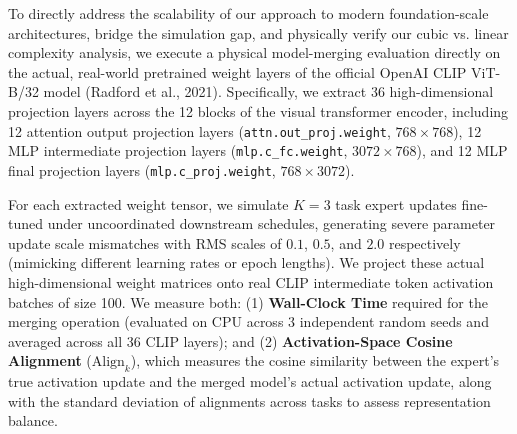To directly address the scalability of our approach to modern foundation-scale architectures, bridge the simulation gap, and physically verify our cubic vs. linear complexity analysis, we execute a physical model-merging evaluation directly on the actual, real-world pretrained weight layers of the official OpenAI CLIP ViT-B/32 model (Radford et al., 2021). Specifically, we extract 36 high-dimensional projection layers across the 12 blocks of the visual transformer encoder, including 12 attention output projection layers (\texttt{attn.out\_proj.weight}, $768 \times 768$), 12 MLP intermediate projection layers (\texttt{mlp.c\_fc.weight}, $3072 \times 768$), and 12 MLP final projection layers (\texttt{mlp.c\_proj.weight}, $768 \times 3072$).

For each extracted weight tensor, we simulate $K = 3$ task expert updates fine-tuned under uncoordinated downstream schedules, generating severe parameter update scale mismatches with RMS scales of $0.1$, $0.5$, and $2.0$ respectively (mimicking different learning rates or epoch lengths). We project these actual high-dimensional weight matrices onto real CLIP intermediate token activation batches of size 100. We measure both: (1) \textbf{Wall-Clock Time} required for the merging operation (evaluated on CPU across 3 independent random seeds and averaged across all 36 CLIP layers); and (2) \textbf{Activation-Space Cosine Alignment} ($\text{Align}_k$), which measures the cosine similarity between the expert's true activation update and the merged model's actual activation update, along with the standard deviation of alignments across tasks to assess representation balance.

